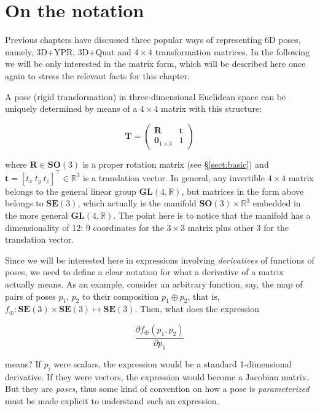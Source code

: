 \documentclass[a4paper,11pt]{report}
\begin{document}
\section{On the notation}
\label{sect:mat_deriv:not}

Previous chapters have discussed three popular ways of representing 6D poses, 
namely, 3D+YPR, 3D+Quat and $4\times 4$ transformation matrices.
In the following we will be only interested in the matrix form, which will be 
described here once again to stress the relevant facts for this chapter.

A pose (rigid transformation) in three-dimensional Euclidean space can be uniquely determined by means
of a $4 \times 4$ matrix with this structure:

\begin{equation}
\label{eq:T_Rt}
 \mathbf{T} = 
\left(
\begin{array}{c|c}
  \mathbf{R} & \mathbf{t} \\
\hline
  \mathbf{0}_{1\times 3} & 1
\end{array}
\right)
\end{equation}

\noindent where $\mathbf{R} \in \mathbf{SO}(3)$  
is a proper rotation matrix (see \S\ref{sect:basic}) and $\mathbf{t}=[t_x ~ t_y ~ t_z]^\top \in \mathbb{R}^3$ is a translation vector.
In general, any invertible $4 \times 4$ matrix belongs to the 
general linear group $\mathbf{GL}(4,\mathbb{R})$, but 
matrices in the form above belongs to $\mathbf{SE}(3)$, 
which actually is the manifold $\mathbf{SO}(3) \times \mathbb{R}^3$
embedded in the more general $\mathbf{GL}(4,\mathbb{R})$.
The point here is to notice that the manifold has a dimensionality of 12: 
9 coordinates for the $3\times 3$ matrix plus other 3 for the translation vector.

Since we will be interested here in expressions involving \emph{derivatives} of functions of poses, 
we need to define a clear notation for what a derivative of a matrix actually means.
As an example, consider an arbitrary function, say, 
the map of pairs of poses $p_1$, $p_2$ to their composition $p_1 \oplus p_2$, that is,
$f_\oplus: \mathbf{SE}(3) \times \mathbf{SE}(3) \mapsto \mathbf{SE}(3)$. 
Then, what does the expression 

\begin{equation}
\label{eq:deriv_sample1}
\frac{\partial f_\oplus(p_1,p_2)}{\partial p_1}
\end{equation}

\noindent means? 
If $p_i$ were scalars, the expression would be a standard 1-dimensional derivative. 
If they were vectors, the expression would become a Jacobian matrix. 
But they are \emph{poses}, thus some kind of convention on how a pose is \emph{parameterized}
must be made explicit to understand such an expression.
\end{document}
